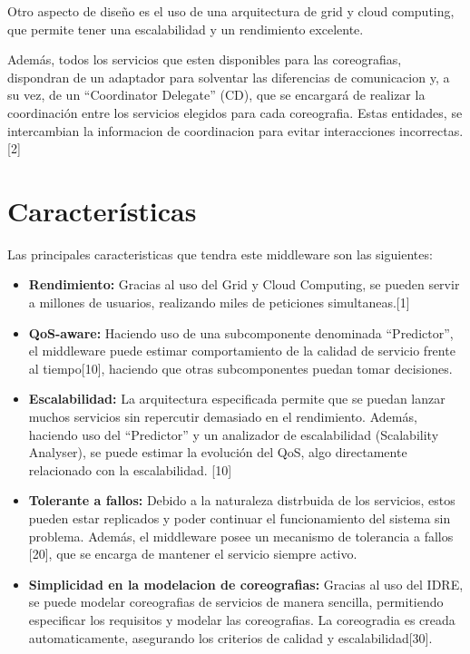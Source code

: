 \documentclass[runningheads]{llncs}
\begin{document}
Otro aspecto de diseño es el uso de una arquitectura de grid y cloud computing, que permite tener una escalabilidad y un rendimiento excelente.

Además, todos los servicios que esten disponibles para las coreografias, dispondran de un adaptador para solventar las diferencias de comunicacion y, a su vez, de un ``Coordinator Delegate'' (CD), que se encargará de realizar la coordinación entre los servicios elegidos para cada coreografia. Estas entidades, se intercambian la informacion de coordinacion para evitar interacciones incorrectas. [2]

\section{Características}
Las principales caracteristicas que tendra este middleware son las siguientes:

\begin{itemize}
    \item \textbf{Rendimiento: }Gracias al uso del Grid y Cloud Computing, se pueden servir a millones de usuarios, realizando miles de peticiones simultaneas.[1]
    \item \textbf{QoS-aware: }Haciendo uso de una subcomponente denominada ``Predictor'', el middleware puede estimar comportamiento de la calidad de servicio frente al tiempo[10], haciendo que otras subcomponentes puedan tomar decisiones. 
    \item \textbf{Escalabilidad: }La arquitectura especificada permite que se puedan lanzar muchos servicios sin repercutir demasiado en el rendimiento. Además, haciendo uso del ``Predictor'' y un analizador de escalabilidad (Scalability Analyser), se puede estimar la evolución del QoS, algo directamente relacionado con la escalabilidad. [10]
    \item \textbf{Tolerante a fallos: }Debido a la naturaleza distrbuida de los servicios, estos pueden estar replicados y poder continuar el funcionamiento del sistema sin problema. Además, el middleware posee un mecanismo de tolerancia a fallos [20], que se encarga de mantener el servicio siempre activo.
    \item \textbf{Simplicidad en la modelacion de coreografias: }Gracias al uso del IDRE, se puede modelar coreografias de servicios de manera sencilla, permitiendo especificar los requisitos y modelar las coreografias. La coreogradia es creada automaticamente, asegurando los criterios de calidad y escalabilidad[30].
\end{itemize}
\end{document}

